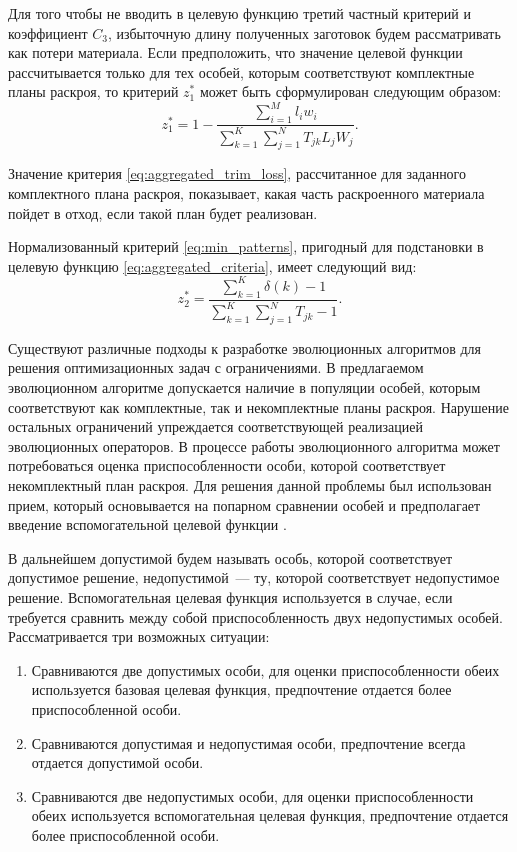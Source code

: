 \documentclass[12pt]{article}
\begin{document}
Для того чтобы не вводить в целевую функцию третий частный критерий и 
коэффициент $C_3$, избыточную длину полученных заготовок будем рассматривать
как потери материала. Если предположить, что значение целевой функции 
рассчитывается только для тех особей, которым соответствуют комплектные планы 
раскроя, то критерий $z_1^*$ может быть сформулирован следующим образом:
\begin{equation}\label{eq:aggregated_trim_loss}
    z_1^*=1-\frac{ \sum_{i=1}^{M} l_iw_i }{ \sum_{k=1}^{K} \sum_{j=1}^{N} T_{jk}L_jW_j }.
\end{equation}

Значение критерия 
\eqref{eq:aggregated_trim_loss}, 
рассчитанное для заданного комплектного плана раскроя, 
показывает, какая часть раскроенного материала пойдет в отход, если такой план 
будет реализован.

Нормализованный критерий 
\eqref{eq:min_patterns}, 
пригодный для подстановки в целевую функцию 
\eqref{eq:aggregated_criteria}, 
имеет следующий вид:
\begin{equation}\label{eq:min_patterns_normalized}
    z_2^*=\frac{ \sum_{k=1}^{K} \delta\left(k\right) - 1 }
    { \sum_{k=1}^{K} \sum_{j=1}^{N} T_{jk} - 1 }.
\end{equation}

Существуют различные подходы к разработке эволюционных алгоритмов для решения 
оптимизационных задач с ограничениями. В предлагаемом эволюционном алгоритме 
допускается наличие в популяции особей, которым соответствуют как комплектные, 
так и некомплектные планы раскроя. Нарушение остальных ограничений упреждается 
соответствующей реализацией эволюционных операторов. В процессе работы 
эволюционного алгоритма может потребоваться оценка приспособленности особи, 
которой соответствует некомплектный план раскроя. Для решения данной проблемы 
был использован прием, который основывается на попарном сравнении особей и 
предполагает введение вспомогательной целевой функции 
\cite{bib:deb00}.

В дальнейшем допустимой будем называть особь, которой соответствует допустимое 
решение, недопустимой~--- ту, которой соответствует недопустимое решение. 
Вспомогательная целевая функция используется в случае, если требуется сравнить 
между собой приспособленность двух недопустимых особей. Рассматривается три 
возможных ситуации:
\begin{enumerate}
    \item Сравниваются две допустимых особи, для оценки приспособленности 
    обеих используется базовая целевая функция, предпочтение отдается более 
    приспособленной особи.
    \item Сравниваются допустимая и недопустимая особи, предпочтение всегда 
    отдается допустимой особи.
    \item Сравниваются две недопустимых особи, для оценки приспособленности 
    обеих используется вспомогательная целевая функция, предпочтение отдается 
    более приспособленной особи.
\end{enumerate}
\end{document}
